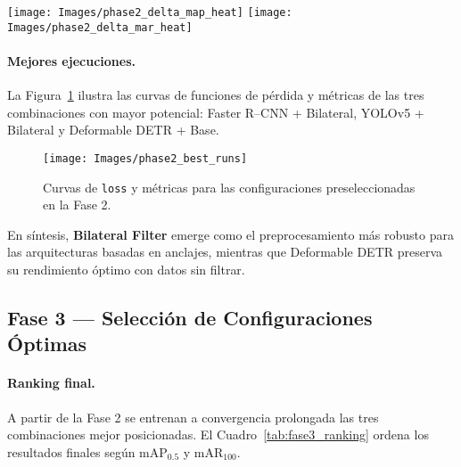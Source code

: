 \begin{figure*}[!ht]
  \centering
  \texttt{[image: Images/phase2\_delta\_map\_heat]}\hfill
  \texttt{[image: Images/phase2\_delta\_mar\_heat]}
  \caption[Diferencia relativa en mAP y mAR]{Matrices de \(\Delta\) respecto a la condición \textit{Base}.
           Izquierda: mAP\(_{0.5}\);\; derecha: mAR\(_{100}\).
           Un valor positivo (verde) indica mejora; negativo (rojo), degradación.}
  \label{fig:fase2_deltas}
\end{figure*}


\paragraph{Mejores ejecuciones.}
La Figura~\ref{fig:fase2_bestruns} ilustra las curvas de funciones de pérdida y métricas de las tres combinaciones con mayor potencial: Faster R–CNN + Bilateral, YOLOv5 + Bilateral y Deformable DETR + Base.

\begin{figure}[!ht]
  \centering
  \texttt{[image: Images/phase2\_best\_runs]}
  \caption[Evolución de las mejores configuraciones]{Curvas de \texttt{loss} y métricas para las configuraciones preseleccionadas en la Fase 2.}
  \label{fig:fase2_bestruns}
\end{figure}

\vspace{0.5em}
En síntesis, \textbf{Bilateral Filter} emerge como el preprocesamiento más robusto para las arquitecturas basadas en anclajes, mientras que Deformable DETR preserva su rendimiento óptimo con datos sin filtrar.

\subsection{Fase 3 — Selección de Configuraciones Óptimas}
\label{ssec:fase3}

\paragraph{Ranking final.}
A partir de la Fase 2 se entrenan a convergencia prolongada las tres combinaciones mejor posicionadas.
El Cuadro~\ref{tab:fase3_ranking} ordena los resultados finales según mAP\(_{0.5}\) y mAR\(_{100}\).

